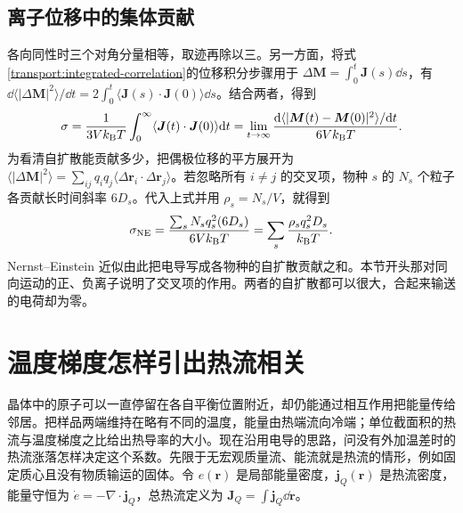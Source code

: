\subsection{离子位移中的集体贡献}
各向同性时三个对角分量相等，取迹再除以三。另一方面，将式\eqref{transport:integrated-correlation}的位移积分步骤用于 $\Delta\bm M=\int_0^t\bm J(s)\dd s$，有 $\dd\langle|\Delta\bm M|^2\rangle/\dd t=2\int_0^t\langle\bm J(s)\cdot\bm J(0)\rangle\dd s$。结合两者，得到
\begin{equation}
\sigma=\frac1{3Vk_{\mathrm B} T}\int_0^\infty\langle\bm J(t)\cdot\bm J(0)\rangle\mathrm{d} t
=\lim_{t\to\infty}\frac{\mathrm{d}\langle|\bm M(t)-\bm M(0)|^2\rangle/\mathrm{d} t}{6Vk_{\mathrm B} T}.
\end{equation}
为看清自扩散能贡献多少，把偶极位移的平方展开为 $\langle|\Delta\bm M|^2\rangle=\sum_{ij}q_iq_j\langle\Delta\bm r_i\cdot\Delta\bm r_j\rangle$。若忽略所有 $i\ne j$ 的交叉项，物种 $s$ 的 $N_s$ 个粒子各贡献长时间斜率 $6D_s$。代入上式并用 $\rho_s=N_s/V$，就得到
\begin{equation}
\sigma_{\rm NE}=\frac{\sum_s N_s q_s^2(6D_s)}{6Vk_{\mathrm B} T}
=\sum_s\frac{\rho_s q_s^2D_s}{k_{\mathrm B} T}.
\end{equation}
Nernst--Einstein 近似由此把电导写成各物种的自扩散贡献之和。本节开头那对同向运动的正、负离子说明了交叉项的作用。两者的自扩散都可以很大，合起来输送的电荷却为零。

\section{温度梯度怎样引出热流相关}
晶体中的原子可以一直停留在各自平衡位置附近，却仍能通过相互作用把能量传给邻居。把样品两端维持在略有不同的温度，能量由热端流向冷端；单位截面积的热流与温度梯度之比给出热导率的大小。现在沿用电导的思路，问没有外加温差时的热流涨落怎样决定这个系数。先限于无宏观质量流、能流就是热流的情形，例如固定质心且没有物质输运的固体。令 $e(\bm r)$ 是局部能量密度，$\bm j_Q(\bm r)$ 是热流密度，能量守恒为 $\dot e=-\nabla\cdot\bm j_Q$，总热流定义为 $\bm J_Q=\int\bm j_Q\dd\bm r$。

